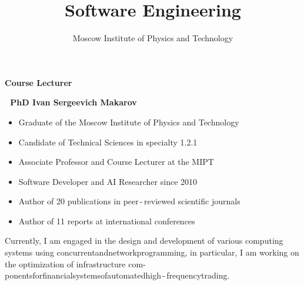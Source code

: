 \documentclass{beamer}
\begin{document}
\title{\bf Software Engineering} 

\author{Moscow Institute of Physics and Technology}

\date{}

\frame{\titlepage}



\begin{frame}{\bf Course Lecturer}

    \textbf{\;\;\;\;\,\,\,\,PhD Ivan Sergeevich Makarov}

    \bigskip
    
    \begin{itemize}

        \item Graduate of the Moscow Institute of Physics and Technology

        \item Candidate of Technical Sciences in specialty 1.2.1

        \item Associate Professor and Course Lecturer at the MIPT

        \item Software Developer and AI Researcher since 2010

        \item Author of 20 publications in peer\,-\,reviewed scientific journals
    
        \item Author of 11 reports at international conferences
        
    \end{itemize}

    \begin{block}
    \justifying Currently, I am engaged in the design and development of various computing systems using concurrent\:and\:network\:programming, in particular, I am working on the optimization of infrastructure com- ponents\;for\;financial\;systems\;of\;automated\;high\,-\,frequency\;trading.
    \end{block}
    
\end{frame}
\end{document}
